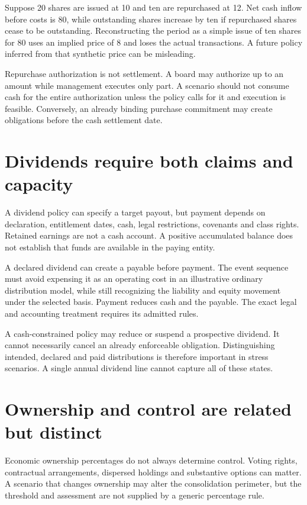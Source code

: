 Suppose 20 shares are issued at 10 and ten are repurchased at 12. Net cash inflow before costs is 80, while outstanding shares increase by ten if repurchased shares cease to be outstanding. Reconstructing the period as a simple issue of ten shares for 80 uses an implied price of 8 and loses the actual transactions. A future policy inferred from that synthetic price can be misleading.

Repurchase authorization is not settlement. A board may authorize up to an amount while management executes only part. A scenario should not consume cash for the entire authorization unless the policy calls for it and execution is feasible. Conversely, an already binding purchase commitment may create obligations before the cash settlement date.

\section{Dividends require both claims and capacity}
A dividend policy can specify a target payout, but payment depends on declaration, entitlement dates, cash, legal restrictions, covenants and class rights. Retained earnings are not a cash account. A positive accumulated balance does not establish that funds are available in the paying entity.

A declared dividend can create a payable before payment. The event sequence must avoid expensing it as an operating cost in an illustrative ordinary distribution model, while still recognizing the liability and equity movement under the selected basis. Payment reduces cash and the payable. The exact legal and accounting treatment requires its admitted rules.

A cash-constrained policy may reduce or suspend a prospective dividend. It cannot necessarily cancel an already enforceable obligation. Distinguishing intended, declared and paid distributions is therefore important in stress scenarios. A single annual dividend line cannot capture all of these states.

\section{Ownership and control are related but distinct}
Economic ownership percentages do not always determine control. Voting rights, contractual arrangements, dispersed holdings and substantive options can matter. A scenario that changes ownership may alter the consolidation perimeter, but the threshold and assessment are not supplied by a generic percentage rule.

